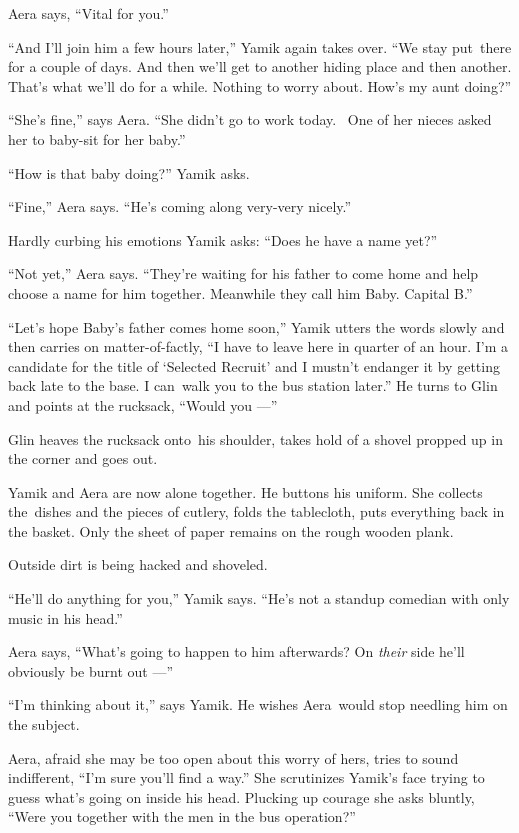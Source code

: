 \documentclass[twoside,11pt,openany]{book}
\begin{document}
Aera says, ``Vital for you.''

``And I'll join him a few hours later,'' Yamik again takes over. ``We stay
put~there for a couple of days. And then we'll get to another hiding place and then another. That's what we'll do for a
while. Nothing to worry about. How's my aunt doing?''

``She's fine,'' says Aera. ``She didn't go to work today.~ One of her nieces
asked her to baby-sit for her baby.''

``How is that baby doing?'' Yamik asks.

``Fine,'' Aera says.  ``He's coming along very-very nicely.''

Hardly curbing his emotions Yamik asks: ``Does he have a name yet?''

``Not yet,'' Aera says. ``They're waiting for his father to come home and help
choose a name for him together. Meanwhile{ }they call him Baby. Capital
B.''

``Let's hope Baby's father comes home soon,'' Yamik utters the words slowly and
then carries on matter-of-factly, ``I have to leave here in quarter of an hour. I'm a candidate for
the title of `Selected Recruit' and I mustn't endanger it by getting back late to the base. I can~walk you to the
bus station later.'' He turns to Glin and points at the rucksack, ``Would you
---''

Glin heaves the rucksack onto~his shoulder, takes hold of a shovel{ }propped up
in the corner and goes out.

Yamik and Aera are now alone together. He buttons his uniform. She collects the~dishes and the pieces of cutlery, folds
the tablecloth, puts everything back in the basket. Only the sheet of paper remains on the rough wooden plank.

Outside dirt{ }is being hacked and shoveled.

``He'll do anything for you,'' Yamik says. ``He's not a standup comedian
with{ }only music in his head.''

Aera says, ``What's going to happen to him afterwards? On \textit{their} side he'll obviously be burnt out ---''

``I'm thinking about it,'' says Yamik. He wishes
Aera~would{ }stop needling him on the subject.

Aera, afraid she may be too open about this worry of hers, tries to sound indifferent, ``I'm sure you'll
find a way.'' She scrutinizes Yamik's face trying to guess what's going on inside his head.  Plucking up
courage she asks bluntly, ``Were you together with the men in the bus operation?''
\end{document}
